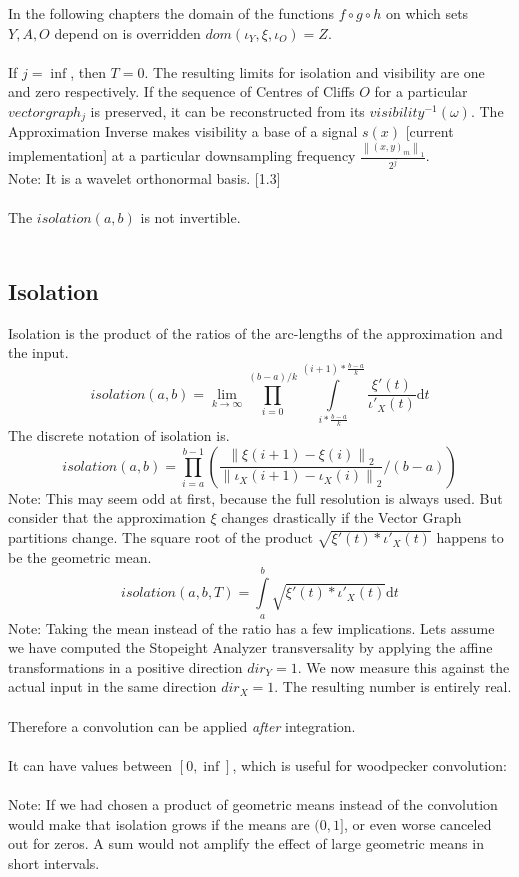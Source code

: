 \documentclass{report}
\newcommand\norm[1]{\left\lVert#1\right\rVert}
\begin{document}
In the following chapters the domain of the functions $f \circ g \circ h$ on which sets $Y,A,O$ depend on is overridden $dom(\iota_{Y},\xi,\iota_{O})=Z$.\\\\
If $j=\inf$, then $T=0$. The resulting limits for isolation and visibility are one and zero respectively.
If the sequence of Centres of Cliffs $O$ for a particular $vectorgraph_{j}$ is preserved, it can be reconstructed from its $visibility^{-1}(\omega)$. The Approximation Inverse makes visibility a base of a signal $s(x)$ \cite{Grapher}[current implementation] at a particular downsampling frequency $\frac{\norm{(x,y)_{m}}_{1}}{2^j}$.\\ Note: It is a wavelet orthonormal basis. \cite{Mallat}[1.3]\\\\
The $isolation(a,b)$ is not invertible.\\\\


\subsection{Isolation}
Isolation is the product of the ratios of the arc-lengths of the approximation and the input.
\begin{equation}
isolation(a,b)=\lim _{k\rightarrow\infty} \prod _{i=0}^{(b-a)/k} \int \limits _{i*\frac{b-a}{k}}^{(i+1)*\frac{b-a}{k}} \frac{\xi'(t)}{\iota'_{X}(t)} \mathrm{d}t
\end{equation}
The discrete notation of isolation is.
\begin{equation}
isolation(a,b)= \prod _{i=a}^{b-1} (\frac{\norm{\xi(i+1)-\xi(i)}_{2}}{\norm{\iota_{X}(i+1)-\iota_{X}(i)}_{2}}/(b-a))
\end{equation}
Note: This may seem odd at first, because the full resolution is always used. But consider that the approximation $\xi$ changes drastically if the Vector Graph partitions change.
The square root of the product $\sqrt{\xi'(t)*\iota'_{X}(t)}$ happens to be the geometric mean.
\begin{equation}
isolation(a,b,T)=\int \limits _{a}^{b} \sqrt{\xi'(t)*\iota'_{X}(t)} \mathrm{d}t
\end{equation}
Note: Taking the mean instead of the ratio has a few implications. Lets assume we have computed the Stopeight Analyzer transversality by applying the affine transformations in a positive direction $dir_{Y}=1$. We now measure this against the actual input in the same direction $dir_{X}=1$. The resulting number is entirely real.\\\\
Therefore a convolution can be applied \emph{after} integration.\\\\
It can have values between $[0,\inf]$, which is useful for woodpecker convolution:\\\\
Note: If we had chosen a product of geometric means instead of the convolution would make that isolation grows if the means are $(0,1]$, or even worse canceled out for zeros. A sum would not amplify the effect of large geometric means in short intervals.
\end{document}
